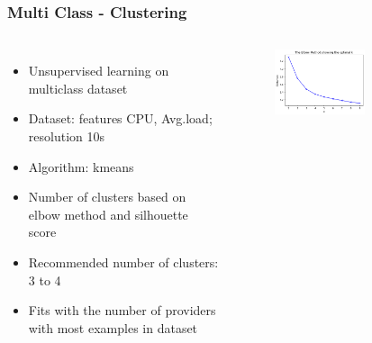 \documentclass[aspectratio=169,11pt,hyperref={colorlinks=true}]{beamer}
\begin{document}
\begin{frame}
    \frametitle{Multi Class - Clustering}
    \begin{columns}
      \begin{itemize}
          \item{Unsupervised learning on multiclass dataset}
          \item{Dataset: features CPU, Avg.load; resolution 10s}
          \item{Algorithm: kmeans}
          \item{Number of clusters based on elbow method and silhouette score}
          \item{Recommended number of clusters: 3 to 4}
          \item{Fits with the number of providers with most examples in dataset}
      \end{itemize}
        \begin{center}
          \begin{table}[h!]
            \begin{center}
            \end{center}
         \end{table}
         \begin{figure}
           \includegraphics[width=0.6\textwidth]{graphs/elbow_method_multiclass.png}
          \end{figure}
        \end{center}
  \end{columns}
\end{frame}
\end{document}
